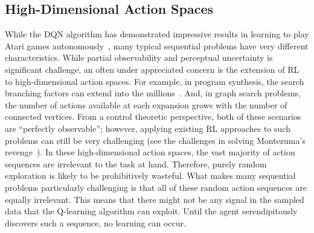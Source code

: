 \subsection*{High-Dimensional Action Spaces}
While the DQN algorithm has demonstrated impressive results in learning to play Atari games autonomously~\cite{mnih2015human}, many typical sequential problems have very different characteristics. While partial observability and perceptual uncertainty is significant challenge, an often under appreciated concern is the extension of RL to high-dimensional action spaces. For example, in program synthesis, the search branching factors can extend into the millions~\cite{menon2013machine}. And, in graph search problems, the number of actions available at each expansion grows with the number of connected vertices. From a control theoretic perspective, both of these scenarios are ``perfectly observable''; however, applying existing RL approaches to such problems can still be very challenging (see the challenges in solving Montezuma's revenge~\cite{bellemare2016unifying}).
In these high-dimensional action spaces, the vast majority of action sequences are irrelevant to the task at hand.
Therefore, purely random exploration is likely to be prohibitively wasteful.
What makes many sequential problems particularly challenging is that all of these random action sequences are equally irrelevant. 
This means that there might not be any signal in the sampled data that the Q-learning algorithm can exploit.
Until the agent serendipitously discovers such a sequence, no learning can occur.






